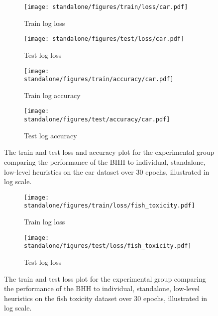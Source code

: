 \begin{figure}[htbp]
	\begin{subfigure}{0.5\textwidth}
		\centering
		\texttt{[image: standalone/figures/train/loss/car.pdf]}
		\caption{Train log loss}
		\label{fig:results:standalone:figures:loss:train:car}
	\end{subfigure}
	\begin{subfigure}{0.5\textwidth}
		\centering
		\texttt{[image: standalone/figures/test/loss/car.pdf]}
		\caption{Test log loss}
		\label{fig:results:standalone:figures:loss:test:car}
	\end{subfigure}
	\par\bigskip
	\begin{subfigure}{0.5\textwidth}
		\centering
		\texttt{[image: standalone/figures/train/accuracy/car.pdf]}
		\caption{Train log accuracy}
		\label{fig:results:standalone:figures:accuracy:train:car}
	\end{subfigure}
	\begin{subfigure}{0.5\textwidth}
		\centering
		\texttt{[image: standalone/figures/test/accuracy/car.pdf]}
		\caption{Test log accuracy}
		\label{fig:results:standalone:figures:accuracy:test:car}
	\end{subfigure}
	\par\bigskip
	\caption{The train and test loss and accuracy plot for the experimental group comparing the performance of the \acs{BHH} to individual, standalone, low-level heuristics on the car dataset over 30 epochs, illustrated in log scale.}
	\label{fig:results:standalone:figures:car}
\end{figure}



\begin{figure}[htbp]
	\begin{subfigure}{0.5\textwidth}
		\centering
		\texttt{[image: standalone/figures/train/loss/fish\_toxicity.pdf]}
		\caption{Train log loss}
		\label{fig:results:standalone:figures:loss:train:fish_toxicity}
	\end{subfigure}
	\begin{subfigure}{0.5\textwidth}
		\centering
		\texttt{[image: standalone/figures/test/loss/fish\_toxicity.pdf]}
		\caption{Test log loss}
		\label{fig:results:standalone:figures:loss:test:fish_toxicity}
	\end{subfigure}
	\par\bigskip
	\caption{The train and test loss plot for the experimental group comparing the performance of the \acs{BHH} to individual, standalone, low-level heuristics on the fish toxicity dataset over 30 epochs, illustrated in log scale.}
	\label{fig:results:standalone:figures:fish_toxicity}
\end{figure}



